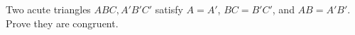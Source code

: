 Two acute triangles $ABC,A\prime B\prime C\prime$ satisfy $A=A\prime$, $BC=B\prime C\prime$, and $AB=A\prime B\prime$. Prove they are congruent.
